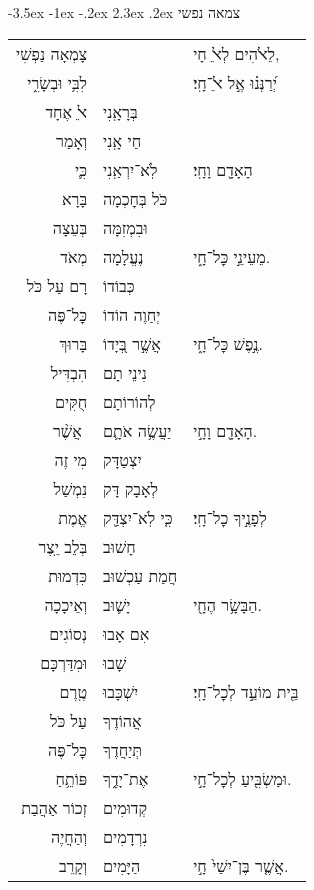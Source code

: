 \documentclass[12pt,letterpaper]{siddur}
\makeatletter
\renewcommand\section{\setcounter{mishnah}{0}\@startsection {section}{1}{\z@}%
                                   {-3.5ex \@plus -1ex \@minus -.2ex}%
                                   {2.3ex \@plus.2ex}%
                                   {\normalfont\large}}
\makeatother
\begin{document}
\section{צמאה נפשי}
\begin{longtable}[r]{r l l}
צָמְאָה נַפְשִׁי &&
לֵﭏֺהִים לְﭏֵ חָי,\\
לִבִּ֥י וּבְשָׂרִ֑י &&
יְ֝רַנְּנ֗וּ אֶ֣ל ﭏֵ־חָֽי׃\\

ﭏֵ אֶחָד & בְּרָאָֽנִי\\
וְאָמַר & חַי אָֽנִי\\
כִּ֛י & לֹֽא־יִרְאַֽנִי &
הָאָדָ֖ם וָחָֽי׃\\

בָּרָא & כֹּל בְּחׇכְמָה\\
בְּעֵצָה & וּבִמְזִמָּה\\
מְאֹד & נֶעֱלָמָה &
מֵעֵינֵ֣י כׇּל־חָ֑י.\\

רָם עַל כֹּל & כְּבוֹדוֹ\\
כׇּל־פֶּה & יְחַוֶה הוֹדוֹ\\
בָּרוּךְ & אֲשֶׁ֣ר בְּ֭יָדוֹ &
נֶ֣פֶשׁ כׇּל־חָ֑י.\\

הִבְדִּיל & נִינֵי תָם\\
חֻקִּים & לְהוֹרוֹתָם\\
אֲשֶׁ֨ר ͏& יַעֲשֶׂ֥ה אֹתָ֛ם &
הָאָדָ֖ם וָחָ֣י.\\

מִי זֶה & יִצְטַדָּק\\
נִמְשַׁל & לְאָבָק דָּק\\
אֱמֶת & כִּ֤י לֹֽא־יִצְדַּ֖ק &
לְפָנֶ֣יךָ כׇל־חָֽי׃\\

בְּלֵב יֵֽצֶר & חָשׁוּב\\
כִּדְמוּת & חֲמַת עַכְשׁוּב\\
וְאֵיכָכָה & יָשׁ֛וּב &
הַבָּשָׂ֥ר הֶחָ֖י.\\

נְסוֹגִים & אִם אָבוּ\\
וּמִדַּרְכָּם & שָׁבוּ\\
טֶֽרֶם & יִשְׁכָּבוּ &
בֵּ֖ית מוֹעֵ֣ד לְכׇל־חָֽי׃ \\

עַל כֹּל & אֲהוֹדֶךָ\\
כׇּל־פֶּה & תְּיַחֲדֶךָ\\
פּוֹתֵ֥חַ & אֶת־יָדֶ֑ךָ &
וּמַשְׂבִּ֖יעַ לְכׇל־חָ֣י.\\

זְכוֹר אַהֲבַת & קְדוּמִים\\
וְהַחֲיֶה & נִרְדָמִים\\
וְקָרֵב & הַיָּמִים &
אֲשֶׁ֤ר בֶּן־יִשַׁי֙ חָ֣י.\\


\end{longtable}
\end{document}
